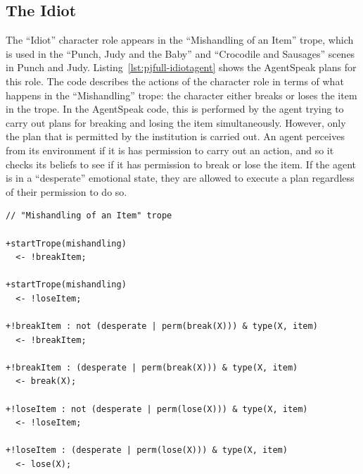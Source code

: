 \documentclass[11pt]{report}
\begin{document}
\subsection{The Idiot}
The ``Idiot'' character role appears in the ``Mishandling
of an Item'' trope, which is used in the ``Punch, Judy and the Baby'' and
``Crocodile and Sausages'' scenes in Punch and Judy.
Listing~\ref{lst:pjfull-idiotagent} shows the AgentSpeak plans for this role.
The code describes the actions of the character role in terms of what happens in
the ``Mishandling'' trope: the character either breaks or loses the item in the
trope. In the AgentSpeak code, this is performed by the agent trying to carry
out plans for breaking and losing the item simultaneously. However, only the
plan that is permitted by the institution is carried out. An agent perceives
from its environment if it is has permission to carry out an action, and so it
checks its beliefs to see if it has permission to break or lose the item. If the
agent is in a ``desperate'' emotional state, they are allowed to execute a plan
regardless of their permission to do so.

\begin{lstlisting}[showstringspaces=false,
label=lst:pjfull-idiotagent,caption={AgentSpeak code for the ``Idiot'' role}]
// "Mishandling of an Item" trope

+startTrope(mishandling)
  <- !breakItem;

+startTrope(mishandling)
  <- !loseItem;

+!breakItem : not (desperate | perm(break(X))) & type(X, item)
  <- !breakItem;

+!breakItem : (desperate | perm(break(X))) & type(X, item)
  <- break(X);

+!loseItem : not (desperate | perm(lose(X))) & type(X, item)
  <- !loseItem;

+!loseItem : (desperate | perm(lose(X))) & type(X, item)
  <- lose(X);
\end{lstlisting}
\end{document}
